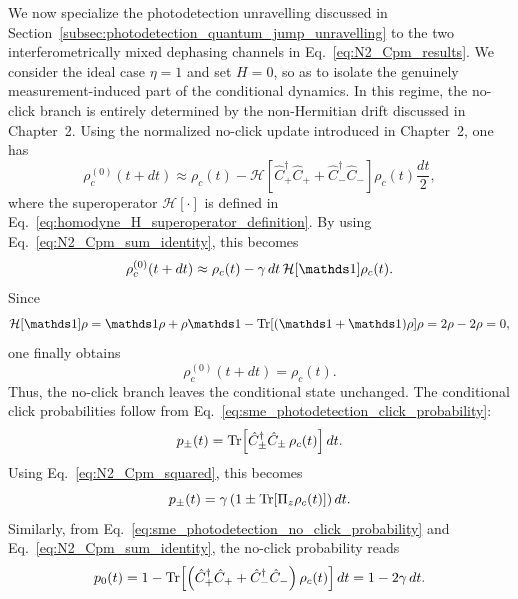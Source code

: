 We now specialize the photodetection unravelling discussed in Section~\ref{subsec:photodetection_quantum_jump_unravelling} to the two interferometrically mixed dephasing channels in Eq.~\eqref{eq:N2_Cpm_results}. We consider the ideal case \(\eta=1\) and set \(H=0\), so as to isolate the genuinely measurement-induced part of the conditional dynamics. In this regime, the no-click branch is entirely determined by the non-Hermitian drift discussed in Chapter~2. Using the normalized no-click update introduced in Chapter~2, one has
\begin{equation}
	\rho_c^{(0)}(t+dt)
	\approx
	\rho_c(t)
	-
	\mathcal{H}\!\left[
	\hat C_+^\dagger \hat C_+
	+
	\hat C_-^\dagger \hat C_-
	\right]\rho_c(t) \frac{dt}{2},
	\label{eq:N2_no_click_genoni_form}
\end{equation}
where the superoperator \(\mathcal{H}[\cdot]\) is defined in Eq.~\eqref{eq:homodyne_H_superoperator_definition}. By using Eq.~\eqref{eq:N2_Cpm_sum_identity}, this becomes
\begin{equation}
	\rho_c^{(0)}(t+dt)
	\approx
	\rho_c(t)
	-
	\gamma\,dt\,\mathcal{H}[\id]\rho_c(t).
\end{equation}
Since
\begin{equation}
	\mathcal{H}[\id]\rho
	=
	\id\rho+\rho\id
	-
	\Tr[(\id+\id)\rho]\rho
	=
	2\rho-2\rho
	=
	0,
\end{equation}
one finally obtains
\begin{equation}
	\rho_c^{(0)}(t+dt)=\rho_c(t).
	\label{eq:N2_no_click_invariant_state}
\end{equation}
Thus, the no-click branch leaves the conditional state unchanged. 
The conditional click probabilities follow from Eq.~\eqref{eq:sme_photodetection_click_probability}:
\begin{equation}
	p_\pm(t)
	=
	\Tr\!\left[\hat C_\pm^\dagger \hat C_\pm\,\rho_c(t)\right]dt.
	\label{eq:N2_click_probabilities_Cpm}
\end{equation}
Using Eq.~\eqref{eq:N2_Cpm_squared}, this becomes
\begin{equation}
	p_\pm(t)
	=
	\gamma
	\left(
	1 \pm \Tr\!\left[\Pi_z\rho_c(t)\right]
	\right)dt.
	\label{eq:N2_click_probabilities_parity}
\end{equation}
Similarly, from Eq.~\eqref{eq:sme_photodetection_no_click_probability} and Eq.~\eqref{eq:N2_Cpm_sum_identity}, the no-click probability reads
\begin{equation}
	p_0(t)
	=
	1-
	\Tr\!\left[
	\left(
	\hat C_+^\dagger \hat C_+ + \hat C_-^\dagger \hat C_-
	\right)\rho_c(t)
	\right]dt
	=
	1-2\gamma\,dt.
	\label{eq:N2_no_click_probability}
\end{equation}

